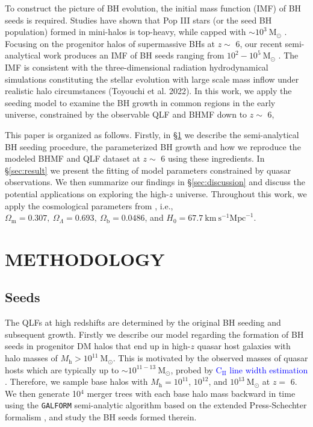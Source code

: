 \documentclass[nolinenumbers,preprint2,tighten]{aastex631}
\newcommand{\Msun}{\mathrm{M_\odot}}
\newcommand{\Mh}{M_\mathrm{h}}
\newcommand{\CII}{\mathrm{C_{II}}}
\newcommand{\blue}[1]{\textcolor{blue}{ #1}}
\begin{document}
\begin{CJK*}{UTF8}{gbsn}
To construct the picture of BH evolution, the initial mass function (IMF) of BH seeds is required.
Studies have shown that Pop III stars (or the seed BH population) formed in mini-halos is top-heavy, while capped with $\sim 10^3~\Msun$ 
\citep{2014ApJ...781...60H,2015MNRAS.448..568H}.
Focusing on the progenitor halos of supermassive BHs at $z\sim$ 6, 
our recent semi-analytical work produces an IMF of BH seeds ranging from $10^2-10^5~\Msun$ \citep{2021ApJ...917...60L}. 
The IMF is consistent with the three-dimensional radiation hydrodynamical simulations 
constituting the stellar evolution with large scale mass inflow under realistic halo circumstances (Toyouchi et al. 2022).
In this work, we apply the seeding model to examine the BH growth in common regions in the early universe, 
constrained by the observable QLF and BHMF down to $z\sim$ 6, 

This paper is organized as follows. Firstly, in \S \ref{sec:method} we describe the semi-analytical BH seeding procedure, 
the parameterized BH growth and how we reproduce the modeled BHMF and QLF dataset at $z\sim$ 6 using these ingredients. 
In \S \ref{sec:result} we present the fitting of model parameters constrained by quasar observations. 
We then summarize our findings in \S \ref{sec:discussion} and discuss the potential applications on exploring the high-$z$ universe.
Throughout this work, we apply the cosmological parameters from \cite{2016A&A...594A..13P},
i.e., $\Omega_{\mathrm{m}}=0.307,~\Omega_{\Lambda}=0.693,~
\Omega_{\mathrm{b}}=0.0486$, and $H_0=67.7 \mathrm{~km} \mathrm{~s}^{-1} \mathrm{Mpc}^{-1}$.

\vspace{5mm}
\section{METHODOLOGY}\label{sec:method}

\vspace{2mm}
\subsection{Seeds}\label{sec:seed}
The QLFs at high redshifts are determined by the original BH seeding and subsequent growth. 
Firstly we describe our model regarding the formation of BH seeds in progenitor DM halos 
that end up in high-$z$ quasar host galaxies with halo masses of $\Mh>10^{11}~\Msun$.
This is motivated by the observed masses of quasar hosts which are typically up to $\sim 10^{11-13}~\Msun$, 
probed by \blue{$\CII$ line width estimation} \citep{2019ApJ...872L..29S}.
Therefore, we sample base halos with $\Mh = 10^{11}$, $10^{12}$, and $10^{13} ~\Msun$ at $z=$ 6. 
We then generate 10$^4$ merger trees with each base halo mass backward in time using the {\tt GALFORM} 
semi-analytic algorithm based on the extended Press-Schechter formalism 
\citep{1974ApJ...187..425P,2000MNRAS.319..168C,2008MNRAS.383..557P}, and study the BH seeds formed therein.


\end{CJK*}
\end{document}
